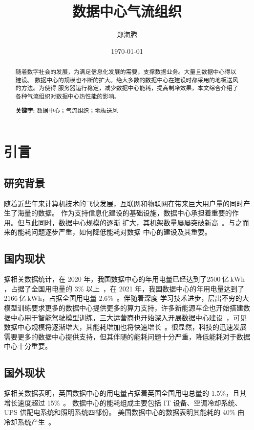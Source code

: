 

\title{数据中心气流组织}
\author{郑海腾}
\date{\today}


\maketitle
\tableofcontents

\newpage
\begin{abstract}
	随着数字社会的发展，为满足信息化发展的需要，支撑数据业务。大量且数据中心得以建设。
数据中心的规模也不断的扩大。绝大多数的数据中心在建设时都采用的地板送风的方法。为使得
服务器运行稳定，减少数据中心能耗，提高制冷效果，本文综合介绍了各种气流组织对数据中心热性能的影响。

\noindent \textbf{关键字:} 数据中心；气流组织；地板送风
\end{abstract}

\section{引言}
\subsection{研究背景}
随着近些年来计算机技术的飞快发展，互联网和物联网在带来巨大用户量的同时产生了海量的数据。
作为支持信息化建设的基础设施，数据中心承担着重要的作用。但与此同时，数据中心规模的逐渐
扩大，其机架数量屡屡突破新高~\cite{1}。与之而来的能耗问题逐步严重，如何降低能耗对数据
中心的建设及其重要。

\subsection{国内现状}
据相关数据统计，在 2020 年，我国数据中心的年用电量已经达到了$\qty{2500}{\text{亿}~\kWh} $，占据了全国用电量的 3\% 以上~\cite{2}，在 2021 年，我国数据中心的年用电量达到了$\qty{2166}{\text{亿}~\kWh}$，占据全国用电量 2.6\%~\cite{3}。伴随着深度
学习技术进步，层出不穷的大模型训练要求更多的数据中心提供更多的算力支持，许多新能源车企也开始搭建数据中心用于智能驾驶模型训练，三大运营商也开始深入开展数据中心建设~\cite{7}，可见数据中心规模将逐渐增大，其能耗增加也将快速增长~\cite{4}。很显然，科技的迅速发展需要更多的数据中心提供支持，但其伴随的能耗问题十分严重，降低能耗对于数据中心十分重要。

\subsection{国外现状}
据相关数据表明，英国数据中心的用电量占据着英国全国用电总量的 1.5\%，且其增长速度超过 15\%~\cite{5}。
数据中心的能耗组成主要包括 IT 设备、空调冷却系统、UPS 供配电系统和照明系统四部份。
美国数据中心的数据表明其能耗的 40\% 由冷却系统产生~\cite{6}。

